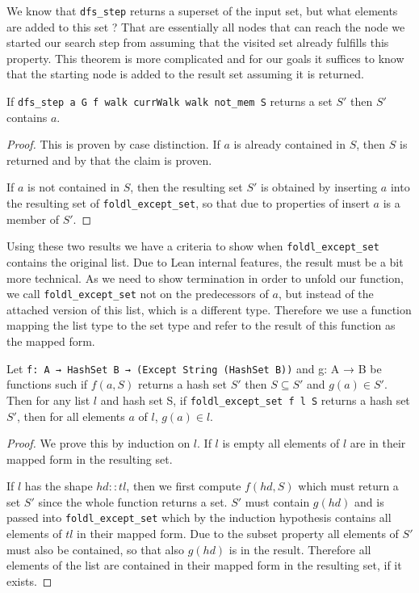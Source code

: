 We know that \texttt{dfs\_step} returns a superset of the input set, but what elements are added to this set ? That are essentially all nodes that can reach the node we started our search step from assuming that the visited set already fulfills this property. This theorem is more complicated and for our goals it suffices to know that the starting node is added to the result set assuming it is returned.

\begin{lemma}
    If \texttt{dfs\_step a G f walk currWalk walk not\_mem S} returns a set $S'$ then $S'$ contains $a$.
\end{lemma}
\begin{proof}
    This is proven by case distinction. If $a$ is already contained in $S$, then $S$ is returned and by that the claim is proven.

    If $a$ is not contained in $S$, then the resulting set $S'$ is obtained by inserting $a$ into the resulting set of \texttt{foldl\_except\_set}, so that due to properties of insert $a$ is a member of $S'$.
\end{proof}


Using these two results we have a criteria to show when \texttt{foldl\_except\_set} contains the original list. Due to Lean internal features, the result must be a bit more technical. As we need to show termination in order to unfold our function, we call \texttt{foldl\_except\_set} not on the predecessors of $a$, but instead of the attached version of this list, which is a different type. Therefore we use a function mapping the list type to the set type and refer to the result of this function as the mapped form.

\begin{lemma}
    Let \texttt{f: A → HashSet B → (Except String (HashSet B))} and {g: A → B} be functions such if $f(a,S) $ returns a hash set $S'$  then $S \subseteq S'$ and $g(a) \in S'$. Then for any list $l$ and hash set S,  if \texttt{foldl\_except\_set f l S} returns a hash set $S'$, then for all elements $a$ of $l$, $g(a) \in l$.
\end{lemma}
\begin{proof}
    We prove this by induction on $l$.
    If $l$ is empty all elements of $l$ are in their mapped form in the resulting set.

    If $l$ has the shape $hd::tl$, then we first compute $f(hd,S)$ which must return a set $S'$ since the whole function returns a set. $S'$ must contain $g(hd)$ and is passed into \texttt{foldl\_except\_set} which by the induction hypothesis contains all elements of $tl$ in their mapped form. Due to the subset property all elements of $S'$ must also be contained, so that also $g(hd)$ is in the result. Therefore all elements of the list are contained in their mapped form in the resulting set, if it exists.
\end{proof}


